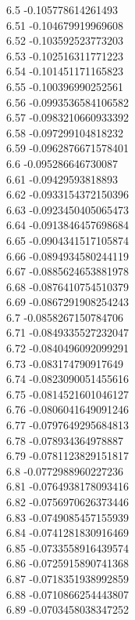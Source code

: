 {6.5	-0.105778614261493\\
6.51	-0.104679919969608\\
6.52	-0.103592523773203\\
6.53	-0.102516311771223\\
6.54	-0.101451171165823\\
6.55	-0.100396990252561\\
6.56	-0.0993536584106582\\
6.57	-0.0983210660933392\\
6.58	-0.097299104818232\\
6.59	-0.0962876671578401\\
6.6	-0.095286646730087\\
6.61	-0.09429593818893\\
6.62	-0.0933154372150396\\
6.63	-0.0923450405065473\\
6.64	-0.0913846457698684\\
6.65	-0.0904341517105874\\
6.66	-0.0894934580244119\\
6.67	-0.0885624653881978\\
6.68	-0.0876410754510379\\
6.69	-0.0867291908254243\\
6.7	-0.0858267150784706\\
6.71	-0.0849335527232047\\
6.72	-0.0840496092099291\\
6.73	-0.083174790917649\\
6.74	-0.0823090051455616\\
6.75	-0.0814521601046127\\
6.76	-0.0806041649091246\\
6.77	-0.0797649295684813\\
6.78	-0.078934364978887\\
6.79	-0.0781123829151817\\
6.8	-0.0772988960227236\\
6.81	-0.0764938178093416\\
6.82	-0.0756970626373446\\
6.83	-0.0749085457155939\\
6.84	-0.0741281830916469\\
6.85	-0.0733558916439574\\
6.86	-0.0725915890741368\\
6.87	-0.0718351938992859\\
6.88	-0.0710866254443807\\
6.89	-0.0703458038347252\\
}
